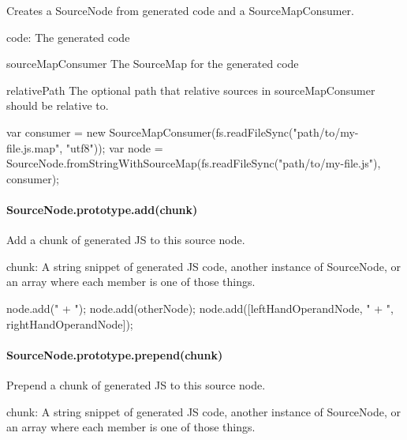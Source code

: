 Creates a Source\+Node from generated code and a Source\+Map\+Consumer.


\begin{DoxyItemize}
\item {\ttfamily code}\+: The generated code
\item {\ttfamily source\+Map\+Consumer} The Source\+Map for the generated code
\item {\ttfamily relative\+Path} The optional path that relative sources in {\ttfamily source\+Map\+Consumer} should be relative to.
\end{DoxyItemize}


\begin{DoxyCode}
var consumer = new SourceMapConsumer(fs.readFileSync("path/to/my-file.js.map", "utf8"));
var node = SourceNode.fromStringWithSourceMap(fs.readFileSync("path/to/my-file.js"),
                                              consumer);
\end{DoxyCode}


\paragraph*{Source\+Node.\+prototype.\+add(chunk)}

Add a chunk of generated JS to this source node.


\begin{DoxyItemize}
\item {\ttfamily chunk}\+: A string snippet of generated JS code, another instance of {\ttfamily Source\+Node}, or an array where each member is one of those things.
\end{DoxyItemize}


\begin{DoxyCode}
node.add(" + ");
node.add(otherNode);
node.add([leftHandOperandNode, " + ", rightHandOperandNode]);
\end{DoxyCode}


\paragraph*{Source\+Node.\+prototype.\+prepend(chunk)}

Prepend a chunk of generated JS to this source node.


\begin{DoxyItemize}
\item {\ttfamily chunk}\+: A string snippet of generated JS code, another instance of {\ttfamily Source\+Node}, or an array where each member is one of those things.
\end{DoxyItemize}


